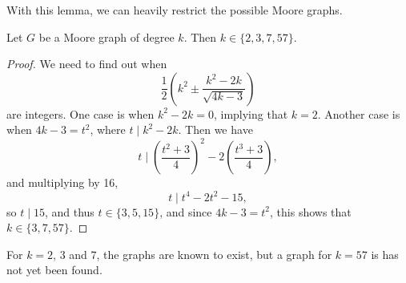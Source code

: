 With this lemma, we can heavily restrict the possible Moore graphs.

\begin{theorem}
	Let $G$ be a Moore graph of degree $k$. Then $k \in \{2, 3, 7, 57\}$.
\end{theorem}
\begin{proof}
	We need to find out when
	$$
	\frac{1}{2}\left(k^{2} \pm \frac{k^{2}-2 k}{\sqrt{4 k-3}}\right)
	$$
	are integers. One case is when $k^2 - 2k = 0$, implying that $k = 2$. Another case is when $4k - 3 = t^2$, where $t \mid k^2 - 2k$. Then we have
	$$
	t \mid\left(\frac{t^{2}+3}{4}\right)^{2}-2\left(\frac{t^{3}+3}{4}\right),
	$$
	and multiplying by 16,
	$$
	t \mid t^4 - 2t^2 - 15,
	$$
	so $t \mid 15$, and thus $t \in \{3, 5, 15\}$, and since $4k - 3 = t^2$, this shows that $k \in \{3, 7, 57\}$.
\end{proof}

\begin{remark}
	For $k = 2$, $3$ and $7$, the graphs are known to exist, but a graph for $k = 57$ is has not yet been found.
\end{remark}

